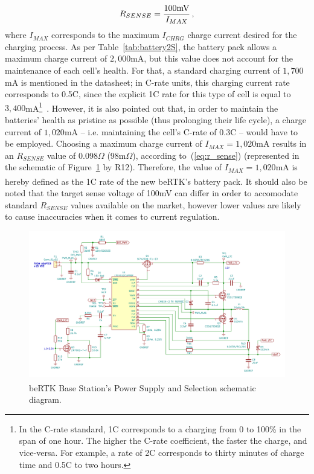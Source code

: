 \begin{equation}\label{eq:r_sense}
    R_{SENSE}=\frac{100 \textrm{mV}}{I_{MAX}}\,,\medskip
\end{equation}
where $I_{MAX}$ corresponds to the maximum $I_{CHRG}$ charge current desired for the charging process. As per Table~\ref{tab:battery2S}, the battery pack allows a maximum charge current of $2,000$mA, but this value does not account for the maintenance of each cell's health. For that, a standard charging current of $1,700$mA is mentioned in the datasheet; in C-rate units, this charging current rate corresponds to 0.5C, since the explicit 1C rate for this type of cell is equal to $3,400$mA\footnote[8]{In the C-rate standard, 1C corresponds to a charging from 0 to 100\% in the span of one hour. The higher the C-rate coefficient, the faster the charge, and vice-versa. For example, a rate of 2C corresponds to thirty minutes of charge time and 0.5C to two hours.}~\cite{C-rate}.
However, it is also pointed out that, in order to maintain the batteries' health as pristine as possible (thus prolonging their life cycle), a charge current of $1,020$mA -- i.e. maintaining the cell's C-rate of 0.3C -- would have to be employed. Choosing a maximum charge current of $I_{MAX}=1,020$mA results in an $R_{SENSE}$ value of 0.098$\Omega$ (98m$\Omega$), according to~(\ref{eq:r_sense}) (represented in the schematic of Figure~\ref{fig:LTC4012_circuit} by R12). Therefore, the value of $I_{MAX}=1,020$mA is hereby defined as the 1C rate of the new beRTK\textsuperscript{\textregistered}'s battery pack. It should also be noted that the target sense voltage of 100mV can differ in order to accomodate standard $R_{SENSE}$ values available on the market, however lower values are likely to cause inaccuracies when it comes to current regulation.

\begin{figure}[h]
	\centering
	\includegraphics[width=1.0\textwidth]{Chapters/Figures/chapter3/Power_Supply_and_Selection.pdf}
	\caption{beRTK\textsuperscript{\textregistered} Base Station's Power Supply and Selection schematic diagram.}
	\label{fig:LTC4012_circuit}
\end{figure}


